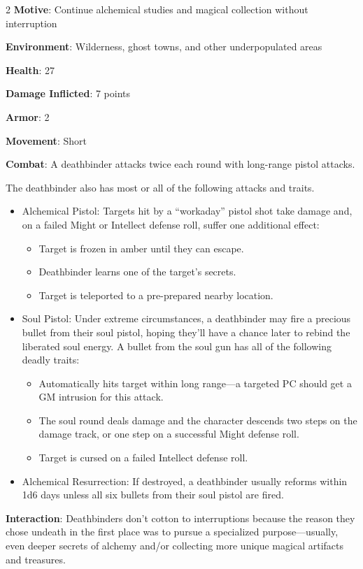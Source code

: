 \begin{multicols}{2}
\textbf{Motive}: Continue alchemical studies and magical collection without interruption 

\textbf{Environment}: Wilderness, ghost towns, and other underpopulated areas 

\textbf{Health}: 27 

\textbf{Damage Inflicted}: 7 points 

\textbf{Armor}: 2 

\textbf{Movement}: Short 

\textbf{Combat}: A deathbinder attacks twice each round with long-range pistol attacks. 

The deathbinder also has most or all of the following attacks and traits. 
\begin{itemize}
\item	Alchemical Pistol: Targets hit by a “workaday” pistol shot take damage and, on a failed Might or Intellect defense roll, suffer one additional effect: 
\begin{itemize}
\item	Target is frozen in amber until they can escape. 
\item	Deathbinder learns one of the target’s secrets. 
\item	Target is teleported to a pre-prepared nearby location. 
\end{itemize}
\item	Soul Pistol: Under extreme circumstances, a deathbinder may fire a precious bullet from their soul pistol, hoping they’ll have a chance later to rebind the liberated soul energy. A bullet from the soul gun has all of the following deadly traits: 
\begin{itemize}
\item	Automatically hits target within long range—a targeted PC should get a GM intrusion for this attack. 
\item	The soul round deals damage and the character descends two steps on the damage track, or one step on a successful Might defense roll. 
\item	Target is cursed on a failed Intellect defense roll. 
\end{itemize}
\item	Alchemical Resurrection: If destroyed, a deathbinder usually reforms within 1d6 days unless all six bullets from their soul pistol are fired. 
\end{itemize}

\textbf{Interaction}: Deathbinders don’t cotton to interruptions because the reason they chose undeath in the first place was to pursue a specialized purpose—usually, even deeper secrets of alchemy and/or collecting more unique magical artifacts and treasures. 


\end{multicols}
